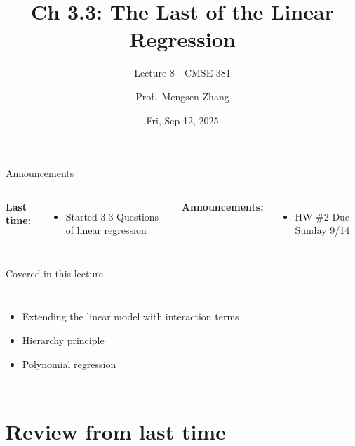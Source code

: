 \documentclass[aspectratio=169,usenames,dvipsnames]{beamer}
\begin{document}
\title[]{Ch 3.3: The Last of the Linear Regression}
\subtitle{Lecture 8 - CMSE 381}
\date{Fri, Sep 12, 2025}



\author[Dr.~Zhang]{Prof.~Mengsen Zhang}

\begin{frame}
 \titlepage


\end{frame}
\begin{frame}[c]{Announcements}

\begin{columns}
\centering

	\textbf{Last time:}
	\begin{itemize}
		\item Started 3.3 Questions of linear regression
	\end{itemize}
\centering

\textbf{Announcements:}
	\begin{itemize}
		\item HW \#2 Due Sunday 9/14
	\end{itemize}
\end{columns}

\end{frame}
\begin{frame}[c]{Covered in this lecture }

\begin{columns}
\centering
\begin{itemize}
	\item Extending the linear model with interaction terms
	\item Hierarchy principle
	\item Polynomial regression
\end{itemize}
\centering

\end{columns}

\end{frame}
\section{Review from last time }
\end{document}
